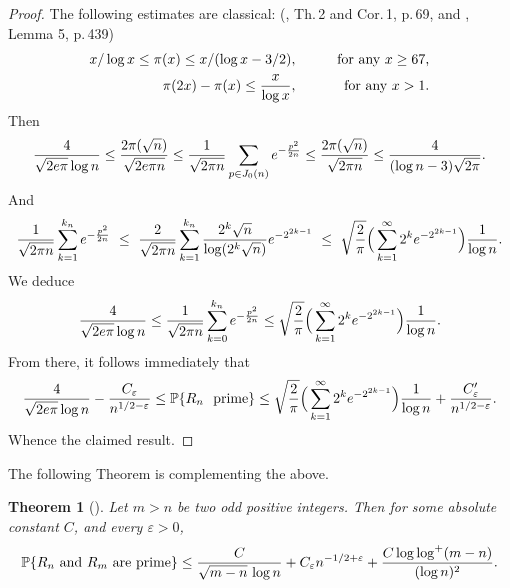 \documentclass[11pt,draft,reqno]{amsart}
\newtheorem{theorem}{Theorem}[section]
\theoremstyle{definition}
\theoremstyle{remarks}
\numberwithin{equation}{section}
\def \e{{\varepsilon}}
\def \qq{{\qquad}}
\def\P{{\mathcal P}}
\def\P{{\mathbb P}}
\begin{document}
\begin{proof}
The following estimates are classical: (\cite{RS}, Th.\,2 and Cor.\,1, p.\,69, and  \cite{DR}, Lemma 5, p.\,439)
\begin{eqnarray*}x/\log x \le \pi(x)\le x/(\log x-3/2), & &\qq \hbox{for any $x\ge 67$,}   \cr 
 \pi(2x)-\pi(x)\le {x\over \log x}, &   & 
 \qq\hbox{for any $x>
1$}.
\end{eqnarray*}
Then $$  {4    \over  \sqrt{ 2e\pi  }\log n}\le{2\pi(\sqrt n)\over  \sqrt{ 2e\pi n}}\le {1\over  \sqrt{ 2\pi n}} \sum_{p\in  J_0(n)}e^{-  {p^2\over  2 n
} }\le   {2\pi(\sqrt n)\over  \sqrt{ 2\pi n}}\le   {4   \over ( \log n-3 ) \sqrt{ 2\pi
 }}.$$
And
\begin{eqnarray*}{1\over  \sqrt{ 2\pi n}}\sum_{k=1}^{k_n}  e^{-  {p^2\over  2 n } }\  \le \ {2\over  \sqrt{ 2\pi n}}\sum_{k=1}^{k_n} {2^{ k  }\sqrt
n\over \log (2^{ k } \sqrt n)}e^{-   2^{2k-1  } } \  \le \  \sqrt{{2
\over     \pi }  }\Big(\sum_{k=1}^{\infty}
{2^{ k }    }e^{-   2^{2k-1  } }\Big)  {1
\over \log     n  }
 .
 \end{eqnarray*}
We deduce
$$ {4    \over  \sqrt{ 2e\pi  }\log n}\le{1\over  \sqrt{ 2\pi n}}\sum_{k=0}^{k_n}  e^{-  {p^2\over  2 n } }\le  \sqrt{{2
\over     \pi }  }\Big(\sum_{k=1}^{\infty}
{2^{ k }    }e^{-   2^{2k-1  } }\Big)  {1
\over \log     n  }.$$
From there, it follows immediately that
$${4    \over  \sqrt{ 2e\pi  }\log n}-{C _\e  \over  n^{  
    1/2-\e }}\le \P\{R_n\ \hbox{ prime} \}\le   \sqrt{{2
\over     \pi }  }\Big(\sum_{k=1}^{\infty}
{2^{ k }    }e^{-   2^{2k-1  } }\Big)  {1
\over \log     n  }+{C'_\e  \over  n^{  
    1/2-\e }}.$$
Whence the claimed result.
\end{proof}


\bigskip\par
\bigskip\par








The following Theorem is complementing the above.
 

\begin{theorem}[\cite{W5a}]\label{P-RnRm} Let $m>n$ be two odd positive integers. Then for some absolute constant $C$, and every $\e>0$,
$$\P\{R_n\ {\rm and } \ R_m\ \hbox{are prime} \}\le  {C\over \sqrt{ m-n } \,\log n} +C_\e n^{-1/2+\e} + {C \log\log^+    (m-n  )\over (\log
n)^2}     .$$\end{theorem} 
 
\end{document}
